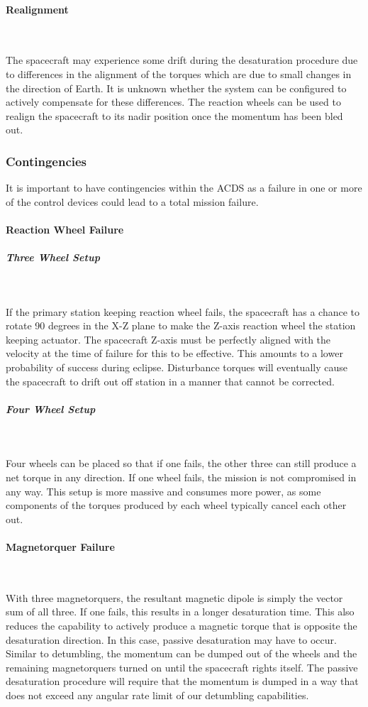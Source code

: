\documentclass[12pt]{article}
\begin{document}
\paragraph{Realignment} \

The spacecraft may experience some drift during the desaturation procedure due to differences in the alignment of the torques which are due to small changes in the direction of Earth. It is unknown whether the system can be configured to actively compensate for these differences. The reaction wheels can be used to realign the spacecraft to its nadir position once the momentum has been bled out.

\subsubsection{Contingencies}

It is important to have contingencies within the ACDS as a failure in one or more of the control devices could lead to a total mission failure.

\paragraph{Reaction Wheel Failure} 
 
\subparagraph{Three Wheel Setup} \

If the primary station keeping reaction wheel fails, the spacecraft has a chance to rotate 90 degrees in the X-Z plane to make the Z-axis reaction wheel the station keeping actuator. The spacecraft Z-axis must be perfectly aligned with the velocity at the time of failure for this to be effective. This amounts to a lower probability of success during eclipse. Disturbance torques will eventually cause the spacecraft to drift out off station in a manner that cannot be corrected.

\subparagraph{Four Wheel Setup} \

Four wheels can be placed so that if one fails, the other three can still produce a net torque in any direction. If one wheel fails, the mission is not compromised in any way. This setup is more massive and consumes more power, as some components of the torques produced by each wheel typically cancel each other out.

\paragraph{Magnetorquer Failure} \

With three magnetorquers, the resultant magnetic dipole is simply the vector sum of all three. If one fails, this results in a longer desaturation time. This also reduces the capability to actively produce a magnetic torque that is opposite the desaturation direction. In this case, passive desaturation may have to occur. Similar to detumbling, the momentum can be dumped out of the wheels and the remaining magnetorquers turned on until the spacecraft rights itself. The passive desaturation procedure will require that the momentum is dumped in a way that does not exceed any angular rate limit of our detumbling capabilities.
\end{document}
